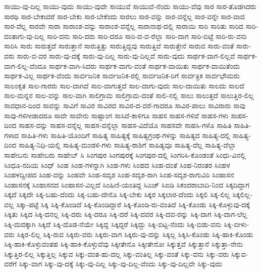 {ಸಾಯು-ವು-ದಿಲ್ಲ
ಸಾಯು-ವುದು
ಸಾಯು-ವುದೇ
ಸಾಯುವೆ
ಸಾಯುವೆ-ನೆಂದು
ಸಾಯು-ವೆವು
ಸಾರ
ಸಾರ-ತೊಡಗಿದರು
ಸಾರಥಿ
ಸಾರ-ಬೇಕಾದರೆ
ಸಾರ-ಬೇಕು
ಸಾರ-ಬೇಕೆಂದು
ಸಾರಲು
ಸಾರ-ವನ್ನು
ಸಾರ-ವನ್ನೆಲ್ಲ
ಸಾರ-ವನ್ನೇ
ಸಾರ-ವಾದ
ಸಾರ-ವೆಲ್ಲ
ಸಾರವೇ
ಸಾರಾ
ಸಾರಾಂಶ-ವನ್ನು
ಸಾರಾಂಶ-ವನ್ನೆಲ್ಲ
ಸಾರಾನಾಥ-ದಲ್ಲಿ
ಸಾರಾಯಿ
ಸಾರಿ
ಸಾರಿತು
ಸಾರಿದ
ಸಾರಿ-ದಂತಾಗು-ವು-ದಿಲ್ಲ
ಸಾರಿ-ದನು
ಸಾರಿ-ದರು
ಸಾರಿ-ದರೂ
ಸಾರಿ-ದ-ವ-ರೆಲ್ಲಾ
ಸಾರಿ-ದಾಗ
ಸಾರಿ-ಬಿಟ್ಟೆ
ಸಾರಿ-ರು-ವನು
ಸಾರಿಸಿ
ಸಾರು
ಸಾರುತ್ತದೆ
ಸಾರುತ್ತಾನೆ
ಸಾರುತ್ತಿತ್ತು
ಸಾರುತ್ತಿದ್ದವು
ಸಾರುತ್ತಿವೆ
ಸಾರುತ್ತೇನೆ
ಸಾರುವ
ಸಾರು-ವಂತೆ
ಸಾರು-ವರು
ಸಾರು-ವ-ವರ
ಸಾರು-ವು-ದಕ್ಕೆ
ಸಾರು-ವು-ದಿಲ್ಲ
ಸಾರು-ವು-ದಿಲ್ಲವೆ
ಸಾರು-ವುದು
ಸಾರ್ಥಕ-ವಾಗ-ಲಿಲ್ಲವೆ
ಸಾರ್ಥಕ-ವಾಗ-ಲಿಲ್ಲ-ವೆಂದೂ
ಸಾರ್ಥಕ-ವಾಗಿ-ಸಿದರು
ಸಾರ್ಥಕ-ವಾಗು-ವಂತೆ
ಸಾರ್ಥಕ-ವಾಯಿತು
ಸಾರ್ಥಕ-ವಾಯಿತೆಂದು
ಸಾರ್ಥಕ-ವಿಲ್ಲ
ಸಾರ್ಥಕ-ವೆಂದು
ಸಾರ್ವಜನಿಕ
ಸಾರ್ವಜನಿಕ-ರಲ್ಲಿ
ಸಾರ್ವಜನಿಕ-ರಿಗೆ
ಸಾರ್ವತ್ರಿಕ
ಸಾರ್ವಭೌಮರು
ಸಾಲಂಕೃತ
ಸಾಲ-ಗಾರರು
ಸಾಲ-ದಾಗಿದೆ
ಸಾಲ-ದಾಗುತ್ತದೆ
ಸಾಲ-ದಾಗು-ವುದು
ಸಾಲ-ದಾಯಿತು
ಸಾಲದು
ಸಾಲದೆ
ಸಾಲ-ಮನ್ನನ
ಸಾಲ-ವನ್ನು
ಸಾಲ-ವಾಗಿ
ಸಾಲಿಗ್ರಾಮ
ಸಾಲಿಗ್ರಾಮ-ದಂತೆ
ಸಾಲಿ-ನಲ್ಲಿ
ಸಾಲು
ಸಾಲುತ್ತದೆ
ಸಾಲುತ್ತಿರ-ಲಿಲ್ಲ
ಸಾವಧಾನ-ದಿಂದ
ಸಾವನ್ನು
ಸಾವಿಗೆ
ಸಾವಿರ
ಸಾವಿರದ
ಸಾವಿರ-ದ-ವರೆ-ಗಾದರೂ
ಸಾವಿರ-ಪಾಲು
ಸಾವಿರಾರು
ಸಾವು
ಸಾವು-ಗಳಿಗೀಡಾದರೂ
ಸಾವೇ
ಸಾವೇನು
ಸಾಷ್ಟಾಂಗ
ಸಾಸಿವೆ-ಕಾಳಿಗೂ
ಸಾಹಸ
ಸಾಹಸ-ಗಳಿವೆ
ಸಾಹಸ-ಗಳು
ಸಾಹಸ-ದಿಂದ
ಸಾಹಸ-ವನ್ನು
ಸಾಹಸ-ವನ್ನೆಲ್ಲ
ಸಾಹಸ-ವನ್ನೆಲ್ಲಾ
ಸಾಹಸ-ವಿದೆಯೊ
ಸಾಹಸವೇ
ಸಾಹಸಿ-ಗಳೊ
ಸಾಹಿತಿ
ಸಾಹಿತಿ-ಗಳಾದ
ಸಾಹಿತಿ-ಗಳು
ಸಾಹಿತಿ-ಯೊಂದಿಗೆ
ಸಾಹಿತ್ಯ
ಸಾಹಿತ್ಯಕ್ಕೆ
ಸಾಹಿತ್ಯಗ್ರಂಥ-ಗಳನ್ನು
ಸಾಹಿತ್ಯದ
ಸಾಹಿತ್ಯ-ದಲ್ಲಿ
ಸಾಹಿತ್ಯ-ದಿಂದ
ಸಾಹಿತ್ಯ-ನಿಧಿ-ಯಲ್ಲಿ
ಸಾಹಿತ್ಯ-ಮಂಡಳಿ-ಗಳು
ಸಾಹಿತ್ಯ-ರಾಶಿಗೆ
ಸಾಹಿತ್ಯವೂ
ಸಾಹಿತ್ಯ-ವೆಲ್ಲ
ಸಾಹಿತ್ಯ-ವೆಲ್ಲಾ
ಸಾಹೇಬನು
ಸಾಹೇಬರು
ಸಾಹೇಬ್
ಸಿ
ಸಿಂಗಪುರ
ಸಿಂಗಪುರಕ್ಕೆ
ಸಿಂಗಪುರ-ದಲ್ಲಿ
ಸಿಂಗರಿಸಿ-ಕೊಂಡಂತೆ
ಸಿಂಧು-ವಿನಲ್ಲಿ
ಸಿಂಧೂ-ನದಿಯ
ಸಿಂಧ್
ಸಿಂಹ
ಸಿಂಹ-ಗಳನ್ನಾಗಿ
ಸಿಂಹ-ಗಳು
ಸಿಂಹದ
ಸಿಂಹ-ದಂತೆ
ಸಿಂಹ-ನಿರಂತರ
ಸಿಂಹಳ
ಸಿಂಹಳದ್ವೀಪದ
ಸಿಂಹ-ವನ್ನು
ಸಿಂಹವೇ
ಸಿಂಹ-ಸದೃಶ
ಸಿಂಹ-ಸದೃಶ-ರಾಗಿ
ಸಿಂಹ-ಸದೃಶ-ರಾಗುವಿರಿ
ಸಿಂಹಾಸನ
ಸಿಂಹಾಸನಕ್ಕೆ
ಸಿಂಹಾಸನದ
ಸಿಂಹಾಸನ-ವಿಲ್ಲದೆ
ಸಿಂಹಿಣಿ-ಯಂತಿದ್ದ
ಸಿಎಚ್
ಸಿಐಡಿ
ಸಿಕಂದರಾಬಾದಿ-ನಿಂದ
ಸಿಕ್ಕದಿದ್ದಾಗ
ಸಿಕ್ಕದೆ
ಸಿಕ್ಕದೇ
ಸಿಕ್ಕ-ಬಹು-ದೆಂದು
ಸಿಕ್ಕ-ಬಹು-ದೇನೊ
ಸಿಕ್ಕ-ಬೇಕು
ಸಿಕ್ಕರ
ಸಿಕ್ಕಲಾರ-ದೆಂದು
ಸಿಕ್ಕಲಿ
ಸಿಕ್ಕ-ಲಿಲ್ಲ
ಸಿಕ್ಕಲಿಲ್ಲ-ವಲ್ಲ
ಸಿಕ್ಕಾ-ಪಟ್ಟೆ
ಸಿಕ್ಕಿ
ಸಿಕ್ಕಿ-ಕೊಂಡಿದೆ
ಸಿಕ್ಕಿ-ಕೊಂಡಿದ್ದಾರೆ
ಸಿಕ್ಕಿ-ಕೊಂಡಿ-ರು-ವಂತಿದೆ
ಸಿಕ್ಕಿ-ಕೊಂಡು
ಸಿಕ್ಕಿ-ಕೊಳ್ಳುವು-ದಕ್ಕೆ
ಸಿಕ್ಕಿತು
ಸಿಕ್ಕಿದ
ಸಿಕ್ಕಿ-ದನಲ್ಲ
ಸಿಕ್ಕಿ-ದರು
ಸಿಕ್ಕಿ-ದರೂ
ಸಿಕ್ಕಿ-ದರೆ
ಸಿಕ್ಕಿ-ದವರ
ಸಿಕ್ಕಿ-ದವ-ರನ್ನು
ಸಿಕ್ಕಿ-ದಾಗ
ಸಿಕ್ಕಿ-ದಾಗ-ಲೆಲ್ಲ
ಸಿಕ್ಕಿ-ದುದಕ್ಕಾಗಿ
ಸಿಕ್ಕಿದೆ
ಸಿಕ್ಕಿ-ದೊಡ-ನೆಯೇ
ಸಿಕ್ಕಿದ್ದ
ಸಿಕ್ಕಿದ್ದರೆ
ಸಿಕ್ಕಿದ್ದು
ಸಿಕ್ಕಿ-ಬಿಟ್ಟ-ನೆಂದು
ಸಿಕ್ಕಿ-ಬಿಡು-ವನು
ಸಿಕ್ಕಿ-ಬೀಳು-ವರು
ಸಿಕ್ಕಿರ-ಲಿಲ್ಲ
ಸಿಕ್ಕಿ-ರುವ
ಸಿಕ್ಕಿರು-ವರು
ಸಿಕ್ಕಿರು-ವಾಗ
ಸಿಕ್ಕಿರು-ವು-ದನ್ನು
ಸಿಕ್ಕಿಲ್ಲ
ಸಿಕ್ಕಿಸಿ-ಕೊಂಡು
ಸಿಕ್ಕಿ-ಹಾಕಿ-ಕೊಂಡು
ಸಿಕ್ಕಿ-ಹಾಕಿ-ಕೊಳ್ಳುವಂತಹ
ಸಿಕ್ಕಿ-ಹಾಕಿ-ಕೊಳ್ಳುವೆವು
ಸಿಕ್ಕೀತೇನೊ
ಸಿಕ್ಕೀತೇನೋ
ಸಿಕ್ಕುತ್ತವೆ
ಸಿಕ್ಕುತ್ತಾನೆ
ಸಿಕ್ಕುತ್ತಾ-ನೇನು
ಸಿಕ್ಕುತ್ತಿರ-ಲಿಲ್ಲ
ಸಿಕ್ಕುತ್ತಿಲ್ಲ
ಸಿಕ್ಕುವ
ಸಿಕ್ಕು-ವಂತ-ಹು-ದಲ್ಲ
ಸಿಕ್ಕು-ವಂತಿಲ್ಲ
ಸಿಕ್ಕು-ವಂತೆ
ಸಿಕ್ಕು-ವನು
ಸಿಕ್ಕು-ವರು
ಸಿಕ್ಕುವ-ವರೆಗೆ
ಸಿಕ್ಕು-ವಾಗ
ಸಿಕ್ಕು-ವು-ದಕ್ಕೆ
ಸಿಕ್ಕು-ವು-ದಿಲ್ಲ
ಸಿಕ್ಕು-ವು-ದಿಲ್ಲ-ವೆಂದು
ಸಿಕ್ಕು-ವು-ದಿಲ್ಲವೇ
ಸಿಕ್ಕು-ವುದು
}

